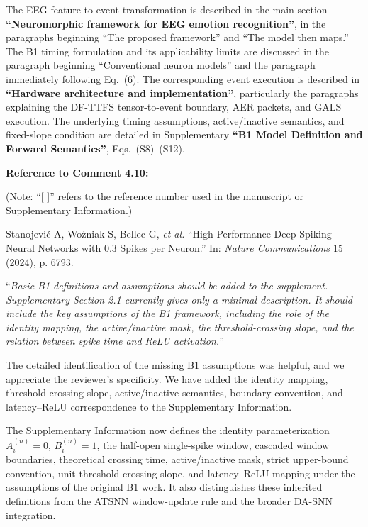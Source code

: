 \documentclass[12pt,technote,onecolumn]{IEEEtran}
\begin{document}
The EEG feature-to-event transformation is described in the main section
\textbf{``Neuromorphic framework for EEG emotion recognition''}, in the
paragraphs beginning ``The proposed framework'' and ``The model then
maps.'' The B1 timing formulation and its applicability limits are
discussed in the paragraph beginning ``Conventional neuron models'' and
the paragraph immediately following Eq.~(6). The corresponding event
execution is described in \textbf{``Hardware architecture and
implementation''}, particularly the paragraphs explaining the DF-TTFS
tensor-to-event boundary, AER packets, and GALS execution. The underlying
timing assumptions, active/inactive semantics, and fixed-slope condition
are detailed in Supplementary \textbf{``B1 Model Definition and Forward
Semantics''}, Eqs.~(S8)--(S12).

\noindent \textbf{Reference to Comment 4.10:}

\noindent(Note: ``[ ]'' refers to the reference number used in the manuscript or Supplementary Information.)

\noindent[42]\:Stanojevi\'{c} A, Wo\.{z}niak S, Bellec G, \textit{et al.} ``High-Performance Deep Spiking Neural Networks with 0.3 Spikes per Neuron.'' In: \textit{Nature Communications} 15 (2024), p. 6793.

\vspace{4mm}

``{\it Basic B1 definitions and assumptions should be added to the
supplement.\\
Supplementary Section 2.1 currently gives only a minimal description. It
should include the key assumptions of the B1 framework, including the
role of the identity mapping, the active/inactive mask, the
threshold-crossing slope, and the relation between spike time and ReLU
activation.}''
\vspace{1mm}


The detailed identification of the missing B1 assumptions was helpful, and we appreciate the reviewer's specificity. We have added the identity mapping, threshold-crossing slope, active/inactive semantics, boundary convention, and latency--ReLU correspondence to the Supplementary Information.

The Supplementary Information now defines the identity parameterization
\(A_i^{(n)}=0\), \(B_i^{(n)}=1\), the half-open single-spike window,
cascaded window boundaries, theoretical crossing time, active/inactive
mask, strict upper-bound convention, unit threshold-crossing slope, and
latency--ReLU mapping under the assumptions of the original B1 work. It
also distinguishes these inherited definitions from the ATSNN
window-update rule and the broader DA-SNN integration.
\end{document}
